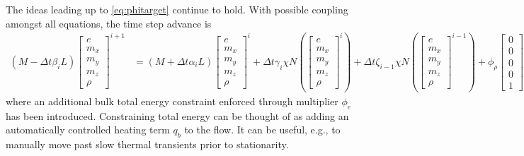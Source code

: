 \documentclass[letterpaper,11pt,nointlimits,reqno]{amsart}
\begin{document}
The ideas leading up to \eqref{eq:phitarget} continue to hold.  With possible
coupling amongst all equations, the time step advance is
\begin{align}
  \left(M - \Delta{}t\beta_{i}L\right)
  \begin{bmatrix} e \\ m_x \\ m_y \\ m_z \\ \rho \end{bmatrix}^{i+1}
&=
  \left(M + \Delta{}t\alpha_{i}L\right)
  \begin{bmatrix} e \\ m_x \\ m_y \\ m_z \\ \rho \end{bmatrix}^{i}
  + \Delta{}t\gamma_{i}\chi{}N\left(
  \begin{bmatrix} e \\ m_x \\ m_y \\ m_z \\ \rho \end{bmatrix}^{i}
  \right)
  + \Delta{}t\zeta_{i-1}\chi{}N\left(
  \begin{bmatrix} e \\ m_x \\ m_y \\ m_z \\ \rho \end{bmatrix}^{i-1}
  \right)
  + \phi_\rho
  \begin{bmatrix} 0 \\ 0 \\ 0 \\ 0 \\ 1 \end{bmatrix}
  + \phi_{m_x}
  \begin{bmatrix} u \\ 1 \\ 0 \\ 0 \\ 0 \end{bmatrix}
  + \phi_{e}
  \begin{bmatrix} 1 \\ 0 \\ 0 \\ 0 \\ 0 \end{bmatrix}
\end{align}
where an additional bulk total energy constraint enforced through multiplier
$\phi_{e}$ has been introduced.  Constraining total energy can be thought of as
adding an automatically controlled heating term $q_b$ to the flow.  It can be
useful, e.g., to manually move past slow thermal transients prior to
stationarity.
\end{document}
